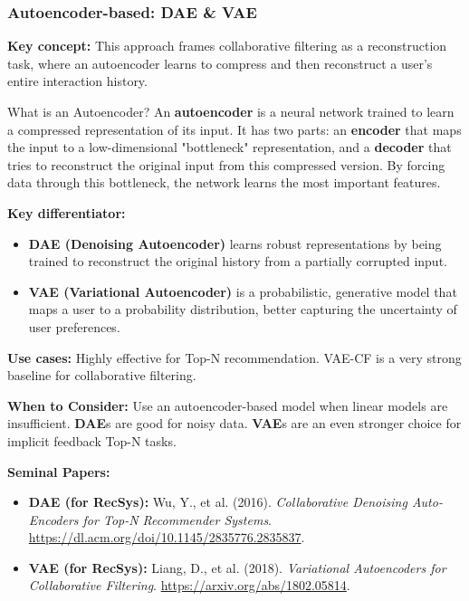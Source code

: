 \documentclass{article}
\begin{document}
    \subsubsection{Autoencoder-based: DAE \& VAE}
\noindent\textbf{Key concept:} This approach frames collaborative filtering as a reconstruction task, where an autoencoder learns to compress and then reconstruct a user's entire interaction history.
    
    \begin{asidebox}{What is an Autoencoder?}
    An \textbf{autoencoder} is a neural network trained to learn a compressed representation of its input. It has two parts: an \textbf{encoder} that maps the input to a low-dimensional "bottleneck" representation, and a \textbf{decoder} that tries to reconstruct the original input from this compressed version. By forcing data through this bottleneck, the network learns the most important features.
    \end{asidebox}

\noindent\textbf{Key differentiator:}
    \begin{itemize}
        \item \textbf{DAE (Denoising Autoencoder)} learns robust representations by being trained to reconstruct the original history from a partially corrupted input.
        \item \textbf{VAE (Variational Autoencoder)} is a probabilistic, generative model that maps a user to a probability distribution, better capturing the uncertainty of user preferences.
    \end{itemize}
\noindent\textbf{Use cases:} Highly effective for Top-N recommendation. VAE-CF is a very strong baseline for collaborative filtering.

\noindent\textbf{When to Consider:} Use an autoencoder-based model when linear models are insufficient. \textbf{DAE}s are good for noisy data. \textbf{VAE}s are an even stronger choice for implicit feedback Top-N tasks.

\noindent\textbf{Seminal Papers:}
    \begin{itemize}
        \item \textbf{DAE (for RecSys):} Wu, Y., et al. (2016). \textit{Collaborative Denoising Auto-Encoders for Top-N Recommender Systems}. \url{https://dl.acm.org/doi/10.1145/2835776.2835837}.
        \item \textbf{VAE (for RecSys):} Liang, D., et al. (2018). \textit{Variational Autoencoders for Collaborative Filtering}. \url{https://arxiv.org/abs/1802.05814}.
    \end{itemize}
    
\end{document}
